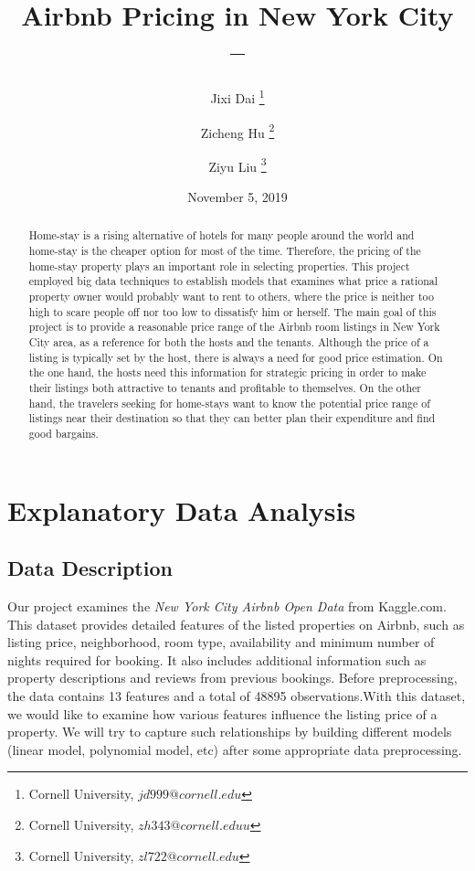 \documentclass[twocolumn]{article}
\title{Airbnb Pricing in New York City \\ -- }
\author{Jixi Dai \footnote{Cornell University, $jd999@cornell.edu$} \and Zicheng Hu \footnote{Cornell University, $zh343@cornell.eduu$} \and Ziyu Liu \footnote{Cornell University, $zl722@cornell.edu$}}
\date{November 5, 2019}
\begin{document}
\begin{titlepage}
\maketitle
\thispagestyle{empty}
\bigskip
\begin{abstract}
Home-stay is a rising alternative of hotels for many people around the world and home-stay is the cheaper
option for most of the time. Therefore, the pricing of the home-stay property plays an important role in
selecting properties. This project employed big data techniques to establish models that examines what price a rational property owner would probably want to rent to others, where the price is neither too high to scare people off nor too low to dissatisfy him or herself. The main goal of this project is to provide a reasonable price range of the Airbnb room listings in New
York City area, as a reference for both the hosts and the tenants. Although the price of a listing is typically set by the host, there is always a need for good price estimation. On the one hand, the hosts need this
information for strategic pricing in order to make their listings both attractive to tenants and profitable to
themselves. On the other hand, the travelers seeking for home-stays want to know the potential price range of listings near their destination so that they can better plan their expenditure and find good bargains.


\end{abstract}
\clearpage
{}
\tableofcontents
\end{titlepage}



\section{Explanatory Data Analysis}

\subsection{Data Description}
Our project examines the \textit{New York City Airbnb Open Data} from Kaggle.com. This dataset provides detailed
features of the listed properties on Airbnb, such as listing price, neighborhood, room type, availability and
minimum number of nights required for booking. It also includes additional information such as property
descriptions and reviews from previous bookings. Before preprocessing, the data contains 13 features and a total of 48895 observations.With this dataset, we would like to examine how various
 features influence the listing price of a property. We will try to capture such relationships by building
different models (linear model, polynomial model, etc) after some appropriate data preprocessing.
\end{document}
